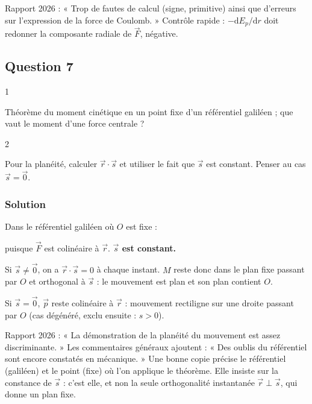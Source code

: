\documentclass[11pt,a4paper]{article}
\newcommand{\equationajustee}[1]{%
  \sbox{\boiteequation}{$\displaystyle #1$}%
  \ifdim\wd\boiteequation>\linewidth
    \[\resizebox{\linewidth}{!}{\usebox{\boiteequation}}\]%
  \else
    \[#1\]%
  \fi}
\begin{document}
\begin{jury}

Rapport 2026 : « Trop de fautes de calcul (signe, primitive) ainsi que d'erreurs sur l'expression de la force de Coulomb. » Contrôle rapide : \(-\mathrm dE_p/\mathrm dr\) doit redonner la composante radiale de \(\vec F\), négative.

\end{jury}

\hypertarget{question-7}{%
\subsection{Question 7}\label{question-7}}

\begin{indication}{1}

Théorème du moment cinétique en un point fixe d'un référentiel galiléen ; que vaut le moment d'une force centrale ?

\end{indication}

\begin{indication}{2}

Pour la planéité, calculer \(\vec r\cdot\vec s\) et utiliser le fait que \(\vec s\) est constant. Penser au cas \(\vec s=\vec0\).

\end{indication}

\hypertarget{solution-6}{%
\subsubsection{Solution}\label{solution-6}}

Dans le référentiel galiléen où \(O\) est fixe :

\equationajustee{\frac{\mathrm d\vec s}{\mathrm dt}=\vec r\wedge\vec F=\vec0}

puisque \(\vec F\) est colinéaire à \(\vec r\). \textbf{\(\vec s\) est constant.}

Si \(\vec s\ne\vec0\), on a \(\vec r\cdot\vec s=0\) à chaque instant. \(M\) reste donc dans le plan fixe passant par \(O\) et orthogonal à \(\vec s\) : le mouvement est plan et son plan contient \(O\).

Si \(\vec s=\vec0\), \(\vec p\) reste colinéaire à \(\vec r\) : mouvement rectiligne sur une droite passant par \(O\) (cas dégénéré, exclu ensuite : \(s>0\)).

\begin{jury}

Rapport 2026 : « La démonstration de la planéité du mouvement est assez discriminante. » Les commentaires généraux ajoutent : « Des oublis du référentiel sont encore constatés en mécanique. » Une bonne copie précise le référentiel (galiléen) et le point (fixe) où l'on applique le théorème. Elle insiste sur la constance de \(\vec s\) : c'est elle, et non la seule orthogonalité instantanée \(\vec r\perp\vec s\), qui donne un plan fixe.

\end{jury}
\end{document}
